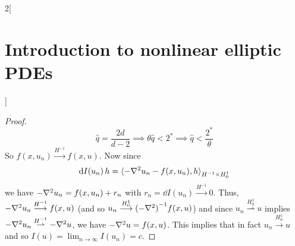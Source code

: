 \documentclass[../../../main_math.tex]{subfiles}
\begin{document}
\begin{multicols}{2}[\section{Introduction to nonlinear elliptic PDEs}]
\begin{proof}
    $$
      \hat{q}=\frac{2d}{d-2}\implies \theta\hat{q}<2^*\implies \hat{q}<\frac{2^*}{\theta}
    $$
    So $f(x,u_n)\overset{H^{-1}}{\longrightarrow} f(x,u)$. Now since
    $$
      \dd{I(u_n)}h={\langle -\laplacian u_n-f(x,u_n),h\rangle}_{H^{-1}\times H_0^1}
    $$
    we have $-\laplacian u_n=f(x,u_n)+r_n$ with $r_n=\dd{I(u_n)}\overset{H^{-1}}{\longrightarrow} 0$. Thus, $-\laplacian u_n\overset{H^{-1}}{\longrightarrow} f(x,u)$ (and so $u_n\overset{H_0^1}{\longrightarrow} {(-\laplacian)}^{-1}f(x,u)$) and since $u_n\overset{H_0^1}{\rightharpoonup} u$ implies $-\laplacian u_n\overset{H^{-1}}{\rightharpoonup} -\laplacian u$, we have $-\laplacian u=f(x,u)$. This implies that in fact $u_n\overset{H_0^1}{\longrightarrow}u$ and so $I(u)=\displaystyle \lim_{n\to\infty}I(u_n)=c$.
  \end{proof}
\end{multicols}
\end{document}
